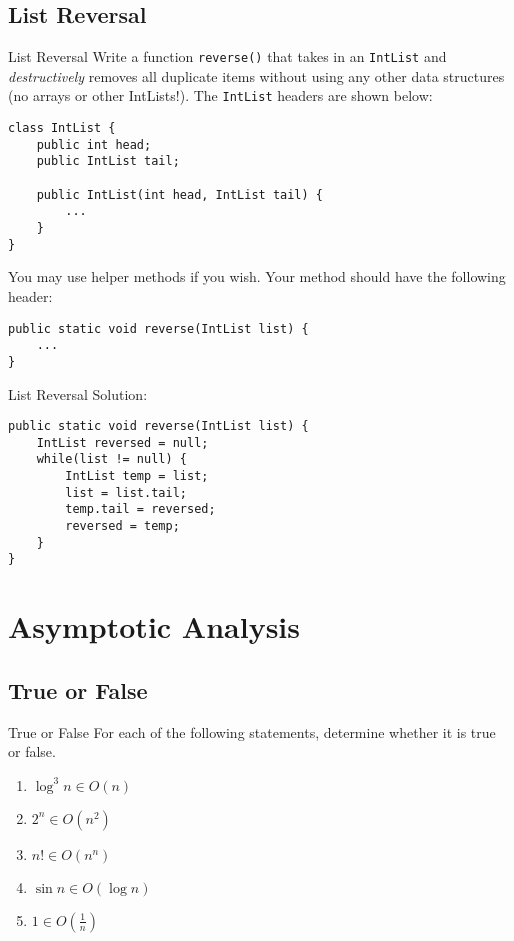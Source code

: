 \documentclass[9pt]{beamer}
\begin{document}
\subsection{List Reversal}
\begin{frame}[fragile]{List Reversal}
  Write a function {\tt reverse()} that takes in an {\tt IntList} and {\em
  destructively} removes all duplicate items without using any other data
  structures (no arrays or other IntLists!). The {\tt IntList} headers are shown
  below:
  \begin{lstlisting}
class IntList {
    public int head;
    public IntList tail;

    public IntList(int head, IntList tail) {
        ...
    }
}
  \end{lstlisting}
  You may use helper methods if you wish. Your method should have the following
  header:
  \begin{lstlisting}
public static void reverse(IntList list) {
    ...
}
  \end{lstlisting}
\end{frame}

\begin{frame}[fragile]{List Reversal}
  Solution:
  \begin{lstlisting}
public static void reverse(IntList list) {
    IntList reversed = null;
    while(list != null) {
        IntList temp = list;
        list = list.tail;
        temp.tail = reversed;
        reversed = temp;
    }
}
  \end{lstlisting}
\end{frame}

\section{Asymptotic Analysis}

\subsection{True or False}
\begin{frame}{True or False}
  For each of the following statements, determine whether it is true or false.
  \begin{enumerate}
    \item
      $\log^{3}{n} \in O(n)$ 
    \item
      $2^n \in O(n^2)$ 
    \item
      $n! \in O(n^n)$ 
    \item
      $\sin{n} \in O(\log{n})$ 
    \item
      $1\in O(\frac{1}{n})$ 
    \pause
  \end{enumerate}
\end{frame}
\end{document}
